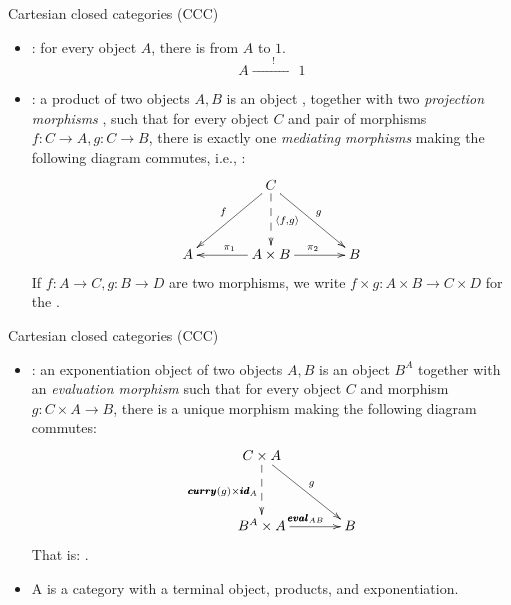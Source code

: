 \documentclass[paper=screen,mode=present,style=zysimple]{powerdot}
\begin{document}
\begin{slide}{Cartesian closed categories (CCC)}
\begin{itemize}\small
\item {}: for every object $A$, there is 
   from $A$ to $1$.
$$A \xrightarrow{\qquad ! \qquad} 1$$ \vspace*{-1.5em}
\item {}: a product of two objects $A, B$ is an object , 
  together with two {\em projection morphisms} , 
  such that for every object $C$ and pair of morphisms $f: C \to A, g : C \to B$, 
  there is exactly one {\em mediating morphisms}  
  making the following diagram commutes, 
  i.e., :
$$
\xymatrix@+=3pc{
  & C \ar[dl]_{f} \ar[dr]^{g} \ar@{-->}[d]^{\cpair{f, g} }& \\
  A & A \times B \ar[l]_{\quad \pi_1 \quad} \ar[r]^{\quad \pi_2 \quad} & B
}
$$
If $f: A \to C, g: B \to D$ are two morphisms, we write $f \times g : A \times B \to C \times D$ 
for the .
\end{itemize}
\end{slide}

\begin{slide}{Cartesian closed categories (CCC)}
\begin{itemize}\small
\item {}: an exponentiation object of two objects $A, B$ is an object $B^A$ 
  together with an {\em evaluation morphism} 
  such that for every object $C$ and morphism $g : C \times A \to B$, 
  there is a unique morphism  
  making the following diagram commutes:
$$
\xymatrix@+=3pc{
  C \times A \ar[dr]^{g} \ar@{-->}[d]_{\pmb{curry}(g) \times \pmb{id}_A} & \\
  B^A \times A \ar[r]^{\pmb{eval}_{AB}} & B
}
$$
That is: .
\item A  is a category 
  with a terminal object, products, and exponentiation.
\end{itemize}
\end{slide}
\end{document}
